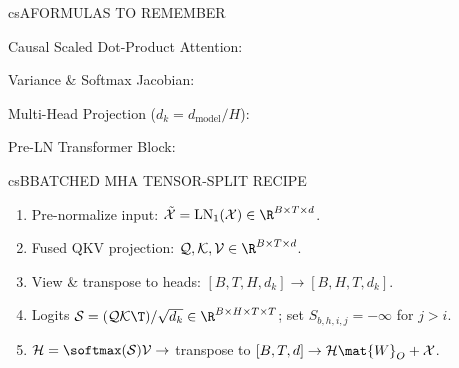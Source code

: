 \documentclass[../../../../master.tex]{subfiles}
\begin{document}

\csnextpage

\begin{cscolumns}
\begin{cscard}{csA}{FORMULAS TO REMEMBER}
  \begin{csbul}
    \item Causal Scaled Dot-Product Attention:
    \item Variance \& Softmax Jacobian:
    \item Multi-Head Projection ($d_k = d_{\mathrm{model}}/H$):
    \item Pre-LN Transformer Block:
  \end{csbul}
\end{cscard}

\begin{cscard}{csB}{BATCHED MHA TENSOR-SPLIT RECIPE}
  \begin{enumerate}[leftmargin=1.2em, itemsep=1pt, topsep=1pt, parsep=0pt]
    \item Pre-normalize input: $\tilde{\mathcal{X}} = \mathrm{LN}_1(\mathcal{X}) \in \R^{B\times T\times d}$.
    \item Fused QKV projection: $\mathcal{Q},\mathcal{K},\mathcal{V} \in \R^{B\times T\times d}$.
    \item View \& transpose to heads: $[B,T,H,d_k] \to [B,H,T,d_k]$.
    \item Logits $\mathcal{S} = (\mathcal{Q}\mathcal{K}\T)/\sqrt{d_k} \in \R^{B\times H\times T\times T}$; set $S_{b,h,i,j}=-\infty$ for $j>i$.
    \item $\mathcal{H} = \softmax(\mathcal{S})\mathcal{V} \to$ transpose to $[B,T,d] \to \mathcal{H}\mat{W}_O + \mathcal{X}$.
  \end{enumerate}
\end{cscard}
\columnbreak


\end{cscolumns}
\end{document}
